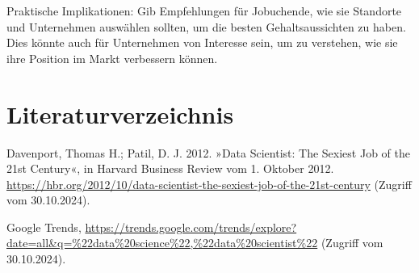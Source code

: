\documentclass[
]{article}
\begin{document}
Praktische Implikationen: Gib Empfehlungen für Jobuchende, wie sie
Standorte und Unternehmen auswählen sollten, um die besten
Gehaltsaussichten zu haben. Dies könnte auch für Unternehmen von
Interesse sein, um zu verstehen, wie sie ihre Position im Markt
verbessern können.

\newpage

\section{Literaturverzeichnis}\label{literaturverzeichnis}

Davenport, Thomas H.; Patil, D. J. 2012. »Data Scientist: The Sexiest
Job of the 21st Century«, in Harvard Business Review vom 1. Oktober
2012.
\url{https://hbr.org/2012/10/data-scientist-the-sexiest-job-of-the-21st-century}
(Zugriff vom 30.10.2024).

Google Trends,
\url{https://trends.google.com/trends/explore?date=all&q=\%22data\%20science\%22,\%22data\%20scientist\%22}
(Zugriff vom 30.10.2024).
\end{document}
